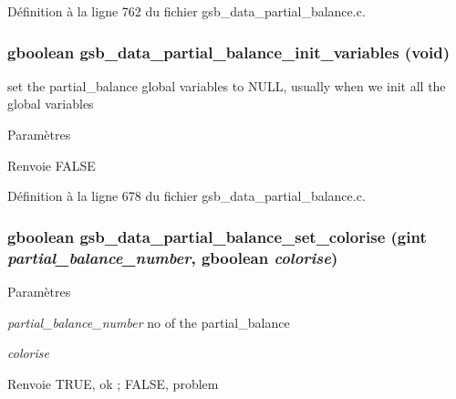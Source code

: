 Définition à la ligne 762 du fichier gsb\_\-data\_\-partial\_\-balance.c.

\subsubsection[{gsb\_\-data\_\-partial\_\-balance\_\-init\_\-variables}]{\setlength{\rightskip}{0pt plus 5cm}gboolean gsb\_\-data\_\-partial\_\-balance\_\-init\_\-variables (void)}\label{gsb__data__partial__balance_8c_a6f4eaeeee77c8cdf2080849eb4df9133}
set the partial\_\-balance global variables to NULL, usually when we init all the global variables


\begin{DoxyParams}{Paramètres}
\item[{\em }]\end{DoxyParams}
\begin{DoxyReturn}{Renvoie}
FALSE 
\end{DoxyReturn}


Définition à la ligne 678 du fichier gsb\_\-data\_\-partial\_\-balance.c.

\subsubsection[{gsb\_\-data\_\-partial\_\-balance\_\-set\_\-colorise}]{\setlength{\rightskip}{0pt plus 5cm}gboolean gsb\_\-data\_\-partial\_\-balance\_\-set\_\-colorise (gint {\em partial\_\-balance\_\-number}, \/  gboolean {\em colorise})}\label{gsb__data__partial__balance_8c_a1089db03152e013649c65d8d8778396c}

\begin{DoxyParams}{Paramètres}
\item[{\em partial\_\-balance\_\-number}]no of the partial\_\-balance \item[{\em colorise}]\end{DoxyParams}
\begin{DoxyReturn}{Renvoie}
TRUE, ok ; FALSE, problem 
\end{DoxyReturn}


